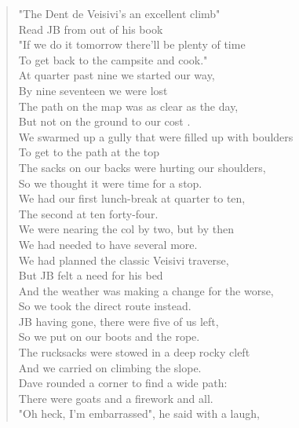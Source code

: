 \documentclass[a5paper,openany,font 10pt]{scrbook}
\begin{document}
\begin{verse}
\vspace*{1em}
"The Dent de Veisivi's an excellent climb"\\
Read JB from out of his book\\
"If we do it tomorrow there'll be plenty of time\\
To get back to the campsite and cook."\\
\vspace*{1em}
At quarter past nine we started our way,\\
By nine seventeen we were lost\\
The path on the map was as clear as the day,\\
But not on the ground  to our cost .\\
\vspace*{1em}
We swarmed up a gully that were filled up with boulders\\
To get to the path at the top\\
The sacks on our backs were hurting our shoulders,\\
So we thought it were time for a stop.\\
\vspace*{1em}
We had our first lunch-break at quarter to ten,\\
The second at ten forty-four.\\
We were nearing the col by two, but by then\\
We had needed to have several more.\\
\vspace*{1em}
We had planned the classic Veisivi traverse,\\
But JB felt a need for his bed\\
And the weather was making a change for the worse,\\
So we took the direct route instead.\\
\vspace*{1em}
JB having gone, there were five of us left,\\
So we put on our boots and the rope.\\
The rucksacks were stowed in a deep rocky cleft\\
And we carried on climbing the slope.\\
Dave rounded a corner to find a wide path:\\
There were goats and a firework and all.\\
"Oh heck, I'm embarrassed", he said with a laugh,\\

\end{verse}
\end{document}
